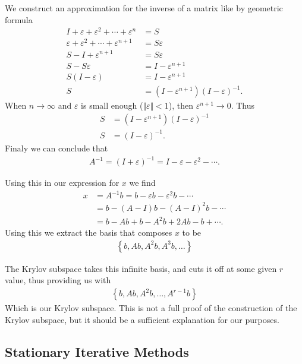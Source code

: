 \documentclass[../fem.tex]{subfiles}
\begin{document}
We construct an approximation for the inverse of a matrix like by geometric
formula
\begin{align*}
  I+\varepsilon+\varepsilon^2+\cdots+\varepsilon^n&=S\\
  \varepsilon+\varepsilon^2+\cdots+\varepsilon^{n+1}&=S\varepsilon\\
  S-I+\varepsilon^{n+1}&=S\varepsilon\\
  S-S\varepsilon&=I-\varepsilon^{n+1}\\
  S(I-\varepsilon)&=I-\varepsilon^{n+1}\\
  S&=\left(I-\varepsilon^{n+1}\right)\left(I-\varepsilon\right)^{-1}.
\end{align*}
When $n\rightarrow \infty$ and $\varepsilon$ is small enough
($\Vert\varepsilon\Vert < 1$), then $\varepsilon^{n+1}\rightarrow 0$. Thus
\begin{align*}
  S&=\left(I-\varepsilon^{n+1}\right)\left(I-\varepsilon\right)^{-1}\\
  S&=\left(I-\varepsilon\right)^{-1}.
\end{align*}
Finaly we can conclude that
\begin{align*}
  A^{-1}=(I+\varepsilon)^{-1}=I-\varepsilon-\varepsilon^2-\cdots.
\end{align*}

Using this in our expression for $x$ we find
\begin{align*}
  x&=A^{-1}b=b-\varepsilon b-\varepsilon^2 b - \cdots\\
   &=b-(A-I)b-(A-I)^2b-\cdots\\
   &=b-Ab+b-A^2b+2Ab-b+\cdots.
\end{align*}
Using this we extract the basis that composes $x$ to be
\begin{align*}
  \left\{b, Ab, A^2b, A^3b, \ldots\right\}
\end{align*}

The Krylov subspace takes this infinite basis, and cuts it off at some given
$r$ value, thus providing us with
\begin{align*}
  \left\{b,Ab,A^2b,\ldots,A^{r-1}b\right\}
\end{align*}
Which is our Krylov subspace. This is not a full proof of the construction of
the Krylov subspace, but it should be a sufficient explanation for our purposes.

\subsection{Stationary Iterative Methods}%
\label{sub:stationary_iterative_methods}
\end{document}
